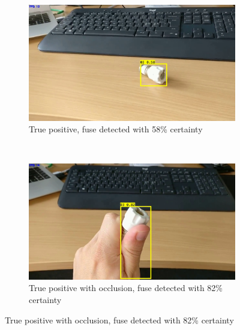 \begin{figure}[H]
	\centering
	\begin{subfigure}[b]{0.48\textwidth}
		\includegraphics[width=\textwidth]{figures/tens1}
		\caption{True positive, fuse detected with 58\% certainty}
		\label{fig:tens1}
	\end{subfigure}
	~
	\begin{subfigure}[b]{0.48\textwidth}
		\includegraphics[width=\textwidth]{figures/tens2}
		\caption{True positive with occlusion, fuse detected with 82\% certainty}
		\label{fig:tens2}
	\end{subfigure}


\end{figure}
